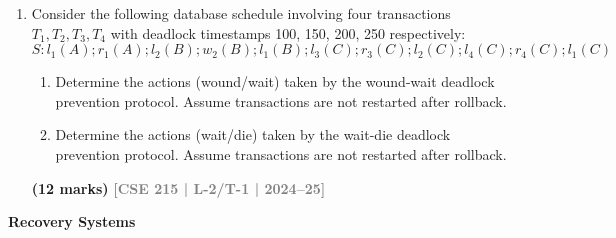 \documentclass[12pt,a3paper]{article}
\newcommand{\yr}[1]{\hfill\textcolor{gray}{\small\textbf{[#1]}}}
\newcommand{\mk}[1]{\textcolor{orange!70!black}{\small\textbf{(#1 marks)}}}
\newcommand{\subtopic}[2]{%
  \vspace{10pt}
  \noindent\begin{tcolorbox}[colback=#1!8,colframe=#1,boxrule=0.6pt,arc=4pt,
    left=6pt,right=6pt,top=4pt,bottom=4pt]
    \small\bfseries\textcolor{#1}{#2}
  \end{tcolorbox}
  \vspace{2pt}
}
\begin{document}
\begin{enumerate}
\item Consider the following database schedule involving four transactions $T_1, T_2, T_3, T_4$ with deadlock timestamps 100, 150, 200, 250 respectively:
\[S\colon l_1(A); r_1(A); l_2(B); w_2(B); l_1(B); l_3(C); r_3(C); l_2(C); l_4(C); r_4(C); l_1(C)\]
\begin{enumerate}
  \item Determine the actions (wound/wait) taken by the wound-wait deadlock prevention protocol. Assume transactions are not restarted after rollback.
  \item Determine the actions (wait/die) taken by the wait-die deadlock prevention protocol. Assume transactions are not restarted after rollback.
\end{enumerate}
\mk{12} \yr{CSE 215 | L-2/T-1 | 2024--25}

\end{enumerate}

\subtopic{cE}{Recovery Systems}
\label{sub:s7-recovery}
\end{document}
